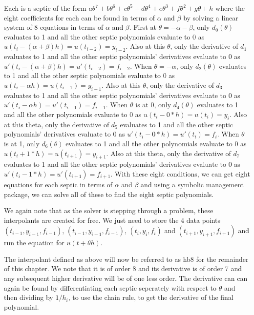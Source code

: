 \documentclass{article}
\begin{document}
Each is a septic of the form $a\theta^7 + b\theta^6 + c\theta^5 + d\theta^4 + e\theta^3 + f\theta^2 + g\theta + h$ where the eight coefficients for each can be found in terms of $\alpha$ and $\beta$ by solving a linear system of 8 equations in terms of $\alpha$ and $\beta$. First at $\theta = -\alpha-\beta$, only $d_0(\theta)$ evaluates to 1 and all the other septic polynomials evaluate to 0 as $u(t_i - (\alpha+\beta) h) = u(t_{i - 2}) = y_{i - 2}$. Also at this $\theta$, only the derivative of $d_1$ evaluates to 1 and all the other septic polynomials' derivatives evaluate to 0 as $u'(t_i - (\alpha+\beta) h) = u'(t_{i - 2}) = f_{i - 2}$. When $\theta = -\alpha$, only $d_2(\theta)$ evaluates to 1 and all the other septic polynomials evaluate to 0 as $u(t_i - \alpha h) = u(t_{i - 1}) = y_{i - 1}$. Also at this $\theta$, only the derivative of $d_3$ evaluates to 1 and all the other septic polynomials' derivatives evaluate to 0 as $u'(t_i - \alpha h) = u'(t_{i - 1}) = f_{i - 1}$. When $\theta$ is at 0, only $d_4(\theta)$ evaluates to 1 and all the other polynomials evaluate to 0 as $u(t_i - 0*h) = u(t_i) = y_i$. Also at this theta, only the derivative of $d_5$ evaluates to 1 and all the other septic polynomials' derivatives evaluate to 0 as $u'(t_i - 0*h) = u'(t_i) = f_i$. When $\theta$ is at 1, only $d_6(\theta)$ evaluates to 1 and all the other polynomials evaluate to 0 as $u(t_i + 1*h) = u(t_{i+1}) = y_{i+1}$. Also at this theta, only the derivative of $d_7$ evaluates to 1 and all the other septic polynomials' derivatives evaluate to 0 as $u'(t_i - 1*h) = u'(t_{i+1}) = f_{i+1}$. With these eight conditions, we can get eight equations for each septic in terms of $\alpha$ and $\beta$ and using a symbolic management package, we can solve all of these to find the eight septic polynomials.

We again note that as the solver is stepping through a problem, these interpolants are created for free. We just need to store the 4 data points $(t_{i-1}, y_{i - 1}, f_{i - 1})$, $(t_{i-1}, y_{i - 1}, f_{i - 1})$, $(t_i, y_i, f_i)$ and $(t_{i + 1}, y_{i + 1}, f_{i + 1})$ and run the equation for $u(t + \theta h)$.

The interpolant defined as above will now be referred to as hb8 for the remainder of this chapter. We note that it is of order 8 and its derivative is of order 7 and any subsequent higher derivative will be of one less order. The derivative can can again be found by differentiating each septic seperately with respect to $\theta$ and then dividing by $1/h_i$, to use the chain rule, to get the derivative of the final polynomial.
\end{document}
